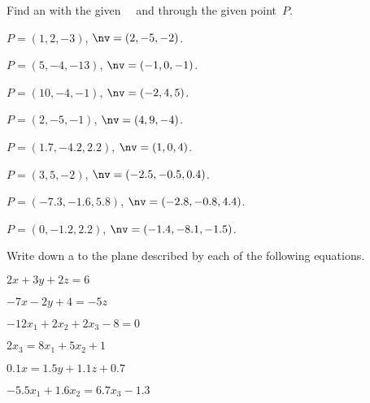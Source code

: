 \begin{exercise}  
Find an  with the given ~\nv\ and through the given point~\(P\).
\begin{Parts}
\item \(P=(1,2,-3)\), \(\nv=(2,-5,-2)\).
\item \(P=(5,-4,-13)\), \(\nv=(-1,0,-1)\).
\begin{OmitV1}
\item \(P=(10,-4,-1)\), \(\nv=(-2,4,5)\).
\item \(P=(2,-5,-1)\), \(\nv=(4,9,-4)\).
\item \(P=(1.7,-4.2,2.2)\), \(\nv=( 1,0,4)\).
\item \(P=(3,5,-2)\), \(\nv=(-2.5,-0.5,0.4)\).
\end{OmitV1}
\item \(P=(-7.3,-1.6,5.8)\), \(\nv=(-2.8,-0.8,4.4)\).
\item \(P=(0,-1.2,2.2)\), \(\nv=(-1.4,-8.1,-1.5)\).
\end{Parts}
\end{exercise}




\begin{exercise}  
Write down a  to the plane described by each of the following equations.
\begin{Parts}
\item \(2x+3y+2z=6\)
\item \(-7x-2y+4=-5z\)
\begin{OmitV1}
\item \(-12x_1+2x_2+2x_3-8=0\)
\item \(2x_3=8x_1+5x_2+1\)
\end{OmitV1}
\item \(0.1x=1.5y+1.1z+0.7\)
\item \(-5.5x_1+1.6x_2=6.7x_3-1.3\)
\end{Parts}
\end{exercise}


